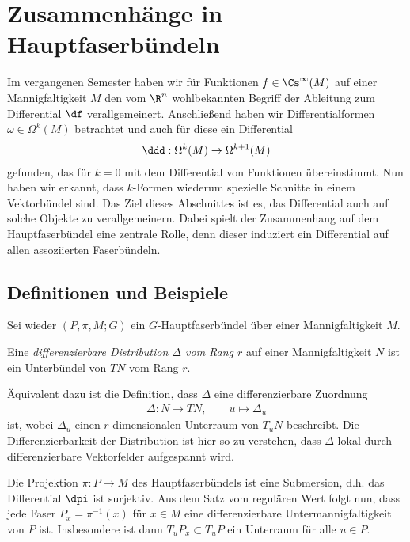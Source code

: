 \documentclass[%
	paper=a5,%
	fleqn,%
	DIV=18,%
	BCOR=0mm,
	fontsize=11pt,
	titlepage=false,%
	bibliography=totoc,
	DIV=18,%
	twoside=true,
	pdftitle=Riemannsche Geometrie,
	pdfauthor=Uwe Semmelmann,
	numbers=noendperiod]%
	{scrbook}
\begin{document}

\chapter{Zusammenhänge in Hauptfaserbündeln}

Im vergangenen Semester haben wir für Funktionen $f\in\Cs^\infty(M)$ auf einer
Mannigfaltigkeit $M$ den vom $\R^n$ wohlbekannten Begriff der Ableitung zum
Differential $\df$ verallgemeinert. Anschließend haben wir
Differentialformen $\omega\in\Omega^k(M)$ betrachtet und auch für diese ein
Differential
\begin{align*}
\ddd : \Omega^k(M)\to \Omega^{k+1}(M)
\end{align*}
gefunden, das für $k=0$ mit dem Differential von Funktionen übereinstimmt. Nun
haben wir erkannt, dass $k$-Formen wiederum spezielle Schnitte in einem
Vektorbündel sind. Das Ziel dieses Abschnittes ist es, das Differential auch auf
solche Objekte zu verallgemeinern. Dabei spielt der Zusammenhang auf dem
Hauptfaserbündel eine zentrale Rolle, denn dieser induziert ein
Differential auf allen assoziierten Faserbündeln. 

\section{Definitionen und Beispiele}

Sei wieder $(P,\pi,M;G)$ ein $G$-Hauptfaserbündel über einer Mannigfaltigkeit
$M$.

\begin{defn}
\label{defn:Distribution}
Eine \emph{differenzierbare Distribution $\Delta$ vom Rang $r$} auf einer
Mannigfaltigkeit $N$ ist ein Unterbündel von $TN$ vom Rang $r$.\fish
\end{defn} 

\begin{rem}
Äquivalent dazu ist die Definition, dass $\Delta$ eine differenzierbare
Zuordnung
\begin{align*}
\Delta : N\to TN,\qquad u\mapsto \Delta_u
\end{align*}
ist, wobei $\Delta_u$ einen $r$-dimensionalen Unterraum von $T_uN$ beschreibt.
Die Differenzierbarkeit der Distribution ist hier so zu verstehen, dass $\Delta$
lokal durch differenzierbare Vektorfelder aufgespannt wird.\map
\end{rem}

Die Projektion $\pi: P\to M$ des Hauptfaserbündels ist eine Submersion, d.h. das
Differential $\dpi$ ist surjektiv. Aus dem Satz vom regulären Wert folgt nun,
dass jede Faser $P_x = \pi^{-1}(x)$ für $x\in M$ eine differenzierbare
Untermannigfaltigkeit von $P$ ist. Insbesondere ist dann $T_uP_x\subset T_uP$
ein Unterraum für alle $u\in P$.
\end{document}
